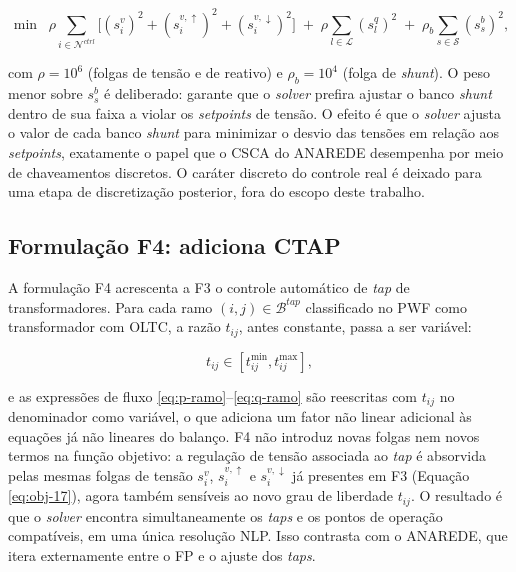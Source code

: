 \begin{equation}
\label{eq:obj-17}
\min \;\; \rho \sum_{i \in \mathcal{N}^{ctrl}} \big[(s^v_i)^2 + (s^{v,\uparrow}_i)^2 + (s^{v,\downarrow}_i)^2 \big] \;+\; \rho \sum_{l \in \mathcal{L}} (s^q_l)^2 \;+\; \rho_b \sum_{s \in \mathcal{S}} (s^b_s)^2,
\end{equation}

\noindent com $\rho = 10^6$ (folgas de tensão e de reativo) e $\rho_b = 10^4$ (folga de \textit{shunt}). O peso menor sobre $s^b_s$ é deliberado: garante que o \textit{solver} prefira ajustar o banco \textit{shunt} dentro de sua faixa a violar os \textit{setpoints} de tensão. O efeito é que o \textit{solver} ajusta o valor de cada banco \textit{shunt} para minimizar o desvio das tensões em relação aos \textit{setpoints}, exatamente o papel que o CSCA do ANAREDE desempenha por meio de chaveamentos discretos. O caráter discreto do controle real é deixado para uma etapa de discretização posterior, fora do escopo deste trabalho.

\subsection{Formulação F4: adiciona CTAP}
\label{subsec:f18}

A formulação F4 acrescenta a F3 o controle automático de \textit{tap} de transformadores. Para cada ramo $(i,j) \in \mathcal{B}^{tap}$ classificado no PWF como transformador com OLTC, a razão $t_{ij}$, antes constante, passa a ser variável:

\begin{equation}
\label{eq:ctap-var}
t_{ij} \in [t^{\min}_{ij}, t^{\max}_{ij}],
\end{equation}

\noindent e as expressões de fluxo \eqref{eq:p-ramo}--\eqref{eq:q-ramo} são reescritas com $t_{ij}$ no denominador como variável, o que adiciona um fator não linear adicional às equações já não lineares do balanço. F4 não introduz novas folgas nem novos termos na função objetivo: a regulação de tensão associada ao \textit{tap} é absorvida pelas mesmas folgas de tensão $s^v_i$, $s^{v,\uparrow}_i$ e $s^{v,\downarrow}_i$ já presentes em F3 (Equação \eqref{eq:obj-17}), agora também sensíveis ao novo grau de liberdade $t_{ij}$. O resultado é que o \textit{solver} encontra simultaneamente os \textit{taps} e os pontos de operação compatíveis, em uma única resolução NLP. Isso contrasta com o ANAREDE, que itera externamente entre o FP e o ajuste dos \textit{taps}.

